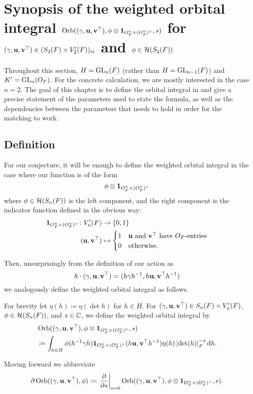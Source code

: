 \chapter{Synopsis of the weighted orbital integral
  $\operatorname{Orb}((\gamma, \mathbf u, \mathbf v^\top), \phi \otimes \mathbf{1}_{O_F^n \times (O_F^n)^\vee}, s)$
  for $(\gamma, \mathbf u, \mathbf v^\top) \in (S_2(F) \times V'_2(F))_{\mathrm{rs}}$
  and $\phi \in \mathcal H(S_2(F))$}
\label{ch:orbitalFJ0}

Throughout this section, $H = \operatorname{GL}_n(F)$ (rather than $H = \operatorname{GL}_{n-1}(F)$)
and $K' = \operatorname{GL}_n(O_F)$.
For the concrete calculation, we are mostly interested in the case $n = 2$.
The goal of this chapter is to define the orbital integral in
 and give a precise statement
of the parameters used to state the formula,
as well as the dependencies between the parameters that needs to hold
in order for the matching to work.

\section{Definition}
For our conjecture, it will be enough to define the weighted orbital integral
in the case where our function is of the form
\[ \phi \otimes \mathbf{1}_{O_F^n \times (O_F^n)^\vee} \]
where $\phi \in \mathcal H(S_n(F))$ is the left component, and
the right component is the indicator function defined in the obvious way:
\begin{align*}
  \mathbf{1}_{O_F^n \times (O_F^n)^\vee} \colon V'_n(F) &\to \{0,1\} \\
  (\mathbf u, \mathbf v^\top) &\mapsto
  \begin{cases}
    1 & \mathbf u \text{ and } \mathbf v^\top \text{ have } O_F \text{-entries} \\
    0 & \text{otherwise}.
  \end{cases}
\end{align*}

Then, unsurprisingly from the definition of our action as
\[ h \cdot {(\gamma, \mathbf u, \mathbf v^\top)} = (h\gamma h^{-1}, h\mathbf u, \mathbf v^\top h^{-1}) \]
we analogously define the weighted orbital integral as follows.
\begin{definition}
  \label{def:orbitalFJ}
  For brevity let $\eta(h) \coloneqq \eta(\det h)$ for $h \in H$.
  For ${(\gamma, \mathbf u, \mathbf v^\top)} \in S_n(F) \times V'_n(F)$,
  $\phi \in \mathcal H(S_n(F))$, and $s \in \mathbb C$,
  we define the weighted orbital integral by
  \begin{align*}
    & \Orb(\guv, \phi \otimes \oneV, s) \\
    &\coloneqq \int_{h \in H} \phi(h\inv \gamma h) \oneV(h \uu, \vv^\top h^{-1})
    \eta(h) \left\lvert \det(h) \right\rvert_F^{-s} \odif h.
  \end{align*}
\end{definition}
\begin{definition}
  Moving forward we abbreviate
  \[ \partial \operatorname{Orb}({(\gamma, \mathbf u, \mathbf v^\top)}, \phi) \coloneqq
    \left. \pdv{}{s} \right\rvert_{s=0}
    \operatorname{Orb}((\gamma, \mathbf u, \mathbf v^\top), \phi \otimes \mathbf{1}_{O_F^n \times (O_F^n)^\vee}, s). \]
\end{definition}


